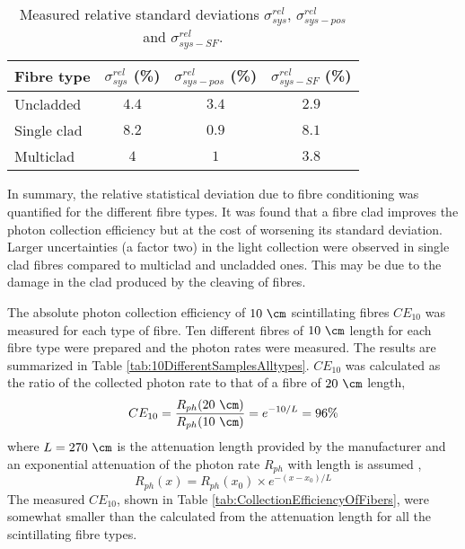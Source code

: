 \begin{table}[htbp]
\centering{}%
\begin{tabular}{lccc}
\toprule 
Fibre type & $\sigma^{rel}_{sys}$ (\%) & $\sigma^{rel}_{sys-pos}$ (\%) & $\sigma^{rel}_{sys-SF}$ (\%) \tabularnewline
\midrule
\midrule 
Uncladded & $4.4$ & $3.4$ & $2.9$ \tabularnewline
Single clad & $8.2$ & $0.9$ & $8.1$ \tabularnewline
Multiclad & $4$ & $1$ & $3.8$ \tabularnewline
\bottomrule
\end{tabular}
\caption{Measured relative standard deviations $\sigma^{rel}_{sys}$, $\sigma^{rel}_{sys-pos}$ and $\sigma^{rel}_{sys-SF}$.}
\label{tab:RelativeStandardDeviations}
\end{table}

In summary, the relative statistical deviation due to fibre conditioning was quantified for the different fibre types. It was found that a fibre clad improves the photon collection efficiency but at the cost of worsening its standard deviation. Larger uncertainties (a factor two) in the light collection were observed in single clad fibres compared to multiclad and uncladded ones. This may be due to the damage in the clad produced by the cleaving of fibres. %

The absolute photon collection efficiency of $10~\cm$ scintillating fibres $CE_{10}$ was measured for each type of fibre. Ten different fibres of $10~\cm$ length for each fibre type were prepared and the photon rates were measured. The results are summarized in Table \ref{tab:10DifferentSamplesAlltypes}. $CE_{10}$ was calculated as the ratio of the collected photon rate to that of a fibre of $20~\cm$ length, 
\begin{equation}
CE_{10}=\frac{R_{ph}(20~\cm)}{R_{ph}(10~\cm)}=e^{-10/L}=96\%
\label{eq:CollectionEfficiency}
\end{equation}
where $L=270~\cm$ is the attenuation length provided by the manufacturer and an exponential attenuation of the photon rate $R_{ph}$ with length is assumed \cite{Leo},
\begin{equation}
R_{ph}(x) = R_{ph}(x_0) \times e^{-(x-x_0)/L}
\label{eq:ExponentialAttenuation}
\end{equation}
The measured $CE_{10}$, shown in Table \ref{tab:CollectionEfficiencyOfFibers}, were somewhat smaller than the calculated from the attenuation length for all the scintillating fibre types.

